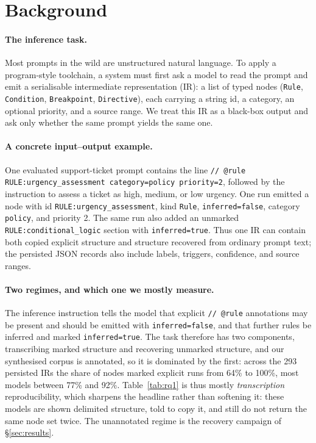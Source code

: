 \documentclass{article}
\begin{document}
\section{Background}
\label{sec:bg}

\paragraph{The inference task.}
Most prompts in the wild are unstructured natural language. To apply a program-style toolchain, a system must first ask a model to read the prompt and emit a serialisable intermediate representation (IR): a list of typed nodes (\texttt{Rule}, \texttt{Condition}, \texttt{Breakpoint}, \texttt{Directive}), each carrying a string id, a category, an optional priority, and a source range. We treat this IR as a black-box output and ask only whether the same prompt yields the same one.

\paragraph{A concrete input--output example.}
One evaluated support-ticket prompt contains the line
\texttt{// @rule RULE:urgency\_assessment category=policy priority=2}, followed by the instruction to assess a ticket as high, medium, or low urgency. One run emitted a node with id \texttt{RULE:urgency\_assessment}, kind \texttt{Rule}, \texttt{inferred=false}, category \texttt{policy}, and priority 2. The same run also added an unmarked \texttt{RULE:conditional\_logic} section with \texttt{inferred=true}. Thus one IR can contain both copied explicit structure and structure recovered from ordinary prompt text; the persisted JSON records also include labels, triggers, confidence, and source ranges.

\paragraph{Two regimes, and which one we mostly measure.}
The inference instruction tells the model that explicit \texttt{// @rule} annotations may be present and should be emitted with \texttt{inferred=false}, and that further rules be inferred and marked \texttt{inferred=true}. The task therefore has two components, transcribing marked structure and recovering unmarked structure, and our synthesised corpus is annotated, so it is dominated by the first: across the 293 persisted IRs the share of nodes marked explicit runs from 64\% to 100\%, most models between 77\% and 92\%. Table~\ref{tab:rq1} is thus mostly \emph{transcription} reproducibility, which sharpens the headline rather than softening it: these models are shown delimited structure, told to copy it, and still do not return the same node set twice. The unannotated regime is the recovery campaign of \S\ref{sec:results}.
\end{document}
